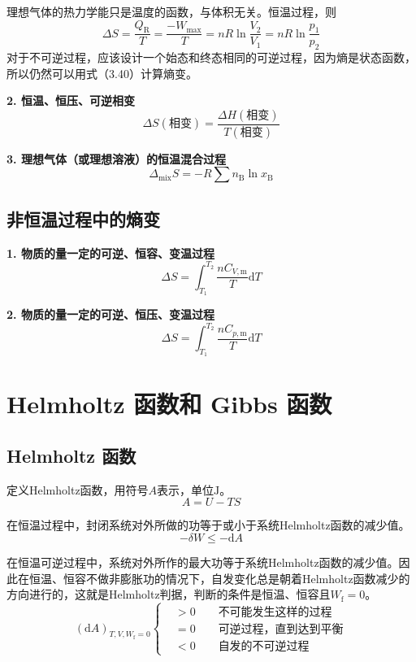 \documentclass[lang=cn,newtx,11pt,scheme=chinese]{elegantbook}
\begin{document}
理想气体的热力学能只是温度的函数，与体积无关。恒温过程，则
\begin{equation}
	\Delta S=\frac{Q_\mathrm{R} }{T}=\frac{-W_\mathrm{max} }{T} =nR\ln \frac{V_2}{V_1}  =nR\ln \frac{p_1}{p_2} 
\end{equation}
对于不可逆过程，应该设计一个始态和终态相同的可逆过程，因为熵是状态函数，所以仍然可以用式（3.40）计算熵变。

\textbf{2. 恒温、恒压、可逆相变}
\begin{equation}
	\Delta S(\text{相变}) = \frac{\Delta H(\text{相变})}{T(\text{相变})}	
\end{equation}

\textbf{3. 理想气体（或理想溶液）的恒温混合过程}
\begin{equation}
	\Delta _\mathrm{mix}S=-R\sum n_\mathrm{B}\ln x_\mathrm{B}   
\end{equation}

\subsection{非恒温过程中的熵变}
\textbf{1. 物质的量一定的可逆、恒容、变温过程}
\begin{equation}
	\Delta S=\int_{T_1}^{T_2}\frac{nC_{V,\mathrm{m} }}{T}\mathrm{d}T   
\end{equation}

\textbf{2. 物质的量一定的可逆、恒压、变温过程}
\begin{equation}
	\Delta S=\int_{T_1}^{T_2}\frac{nC_{p,\mathrm{m} }}{T}\mathrm{d}T   
\end{equation}

\section{Helmholtz 函数和 Gibbs 函数}
\subsection{Helmholtz 函数}
定义Helmholtz函数，用符号$A$表示，单位$\mathrm{J}$。
\begin{equation}
	A=U-TS
\end{equation}

在恒温过程中，封闭系统对外所做的功等于或小于系统Helmholtz函数的减少值。
\begin{equation}
	-\delta W \leqslant -\mathrm{d}A
\end{equation}

在恒温可逆过程中，系统对外所作的最大功等于系统Helmholtz函数的减少值。因此在恒温、恒容不做非膨胀功的情况下，自发变化总是朝着Helmholtz函数减少的方向进行的，这就是Helmholtz判据，判断的条件是恒温、恒容且$W_\mathrm{f}=0$。
\begin{equation}
	(\mathrm{d}A)_{T,V,W_\mathrm{f}=0} \left\{
	\begin{aligned}
		&> 0 \qquad \text{不可能发生这样的过程} \\
		&= 0 \qquad \text{可逆过程，直到达到平衡}\\
		&< 0 \qquad \text{自发的不可逆过程} 
	\end{aligned}
	\right.
\end{equation}
\end{document}
